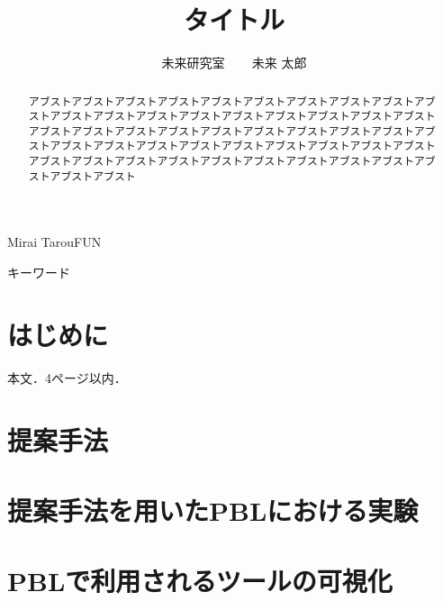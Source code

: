 \documentclass[submit,techrep,noauthor]{ipsj}
\begin{document}
\title{タイトル}


\author{未来研究室 ~~~ 未来 太郎}{Mirai Tarou}{FUN}

\begin{abstract}
  アブストアブストアブストアブストアブストアブストアブストアブストアブストアブストアブストアブストアブストアブストアブストアブストアブストアブストアブストアブストアブストアブストアブストアブストアブストアブストアブストアブストアブストアブストアブストアブストアブストアブストアブストアブストアブストアブストアブストアブストアブストアブストアブストアブストアブストアブストアブストアブストアブストアブスト
\end{abstract}

%
\begin{jkeyword}
  キーワード
\end{jkeyword}
%

\maketitle
\section{はじめに}
本文\cite{sample}．4ページ以内．
\section{提案手法}

\section{提案手法を用いたPBLにおける実験}


\section{PBLで利用されるツールの可視化}


\end{document}
